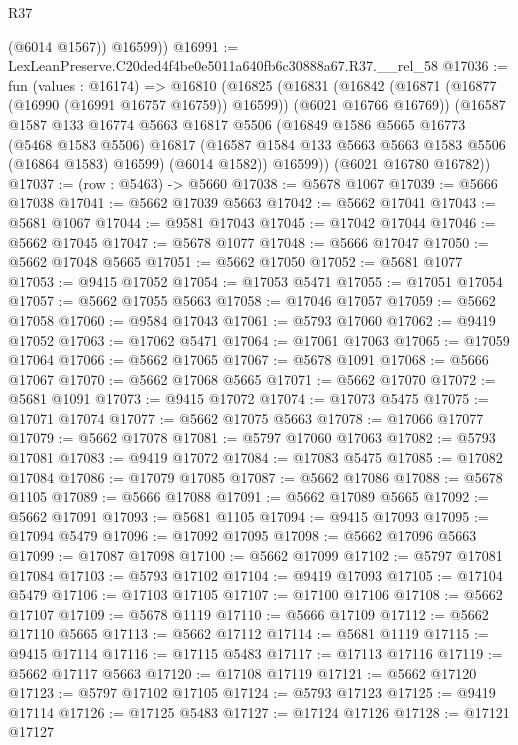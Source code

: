 \begin{lexlean}{R37}
\begin{coremodule}
          (@6014 @1567))
        @16599))
@16991 := LexLeanPreserve.C20ded4f4be0e5011a640fb6c30888a67.R37.__rel_58
@17036 := fun (values : @16174) =>
  @16810
    (@16825
      (@16831
        (@16842 (@16871 (@16877 (@16990 (@16991 @16757 @16759)) @16599)) (@6021 @16766 @16769))
        (@16587
          @1587
          @133
          @16774
          @5663
          @16817
          @5506
          (@16849
            @1586
            @5665
            @16773
            (@5468 @1583 @5506)
            @16817
            (@16587 @1584 @133 @5663 @5663 @1583 @5506 (@16864 @1583) @16599)
            (@6014 @1582))
          @16599))
      (@6021 @16780 @16782))
@17037 := (row : @5463) -> @5660
@17038 := @5678 @1067
@17039 := @5666 @17038
@17041 := @5662 @17039 @5663
@17042 := @5662 @17041
@17043 := @5681 @1067
@17044 := @9581 @17043
@17045 := @17042 @17044
@17046 := @5662 @17045
@17047 := @5678 @1077
@17048 := @5666 @17047
@17050 := @5662 @17048 @5665
@17051 := @5662 @17050
@17052 := @5681 @1077
@17053 := @9415 @17052
@17054 := @17053 @5471
@17055 := @17051 @17054
@17057 := @5662 @17055 @5663
@17058 := @17046 @17057
@17059 := @5662 @17058
@17060 := @9584 @17043
@17061 := @5793 @17060
@17062 := @9419 @17052
@17063 := @17062 @5471
@17064 := @17061 @17063
@17065 := @17059 @17064
@17066 := @5662 @17065
@17067 := @5678 @1091
@17068 := @5666 @17067
@17070 := @5662 @17068 @5665
@17071 := @5662 @17070
@17072 := @5681 @1091
@17073 := @9415 @17072
@17074 := @17073 @5475
@17075 := @17071 @17074
@17077 := @5662 @17075 @5663
@17078 := @17066 @17077
@17079 := @5662 @17078
@17081 := @5797 @17060 @17063
@17082 := @5793 @17081
@17083 := @9419 @17072
@17084 := @17083 @5475
@17085 := @17082 @17084
@17086 := @17079 @17085
@17087 := @5662 @17086
@17088 := @5678 @1105
@17089 := @5666 @17088
@17091 := @5662 @17089 @5665
@17092 := @5662 @17091
@17093 := @5681 @1105
@17094 := @9415 @17093
@17095 := @17094 @5479
@17096 := @17092 @17095
@17098 := @5662 @17096 @5663
@17099 := @17087 @17098
@17100 := @5662 @17099
@17102 := @5797 @17081 @17084
@17103 := @5793 @17102
@17104 := @9419 @17093
@17105 := @17104 @5479
@17106 := @17103 @17105
@17107 := @17100 @17106
@17108 := @5662 @17107
@17109 := @5678 @1119
@17110 := @5666 @17109
@17112 := @5662 @17110 @5665
@17113 := @5662 @17112
@17114 := @5681 @1119
@17115 := @9415 @17114
@17116 := @17115 @5483
@17117 := @17113 @17116
@17119 := @5662 @17117 @5663
@17120 := @17108 @17119
@17121 := @5662 @17120
@17123 := @5797 @17102 @17105
@17124 := @5793 @17123
@17125 := @9419 @17114
@17126 := @17125 @5483
@17127 := @17124 @17126
@17128 := @17121 @17127

\end{coremodule}
\end{lexlean}
